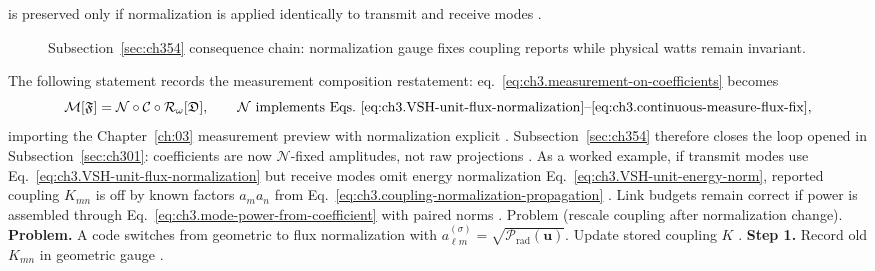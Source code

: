 is preserved only if normalization is applied identically to transmit and receive modes
\cite{harrington2001}.
\begin{figure}[t]
\centering
{}
\caption{Subsection~\ref{sec:ch354} consequence chain: normalization gauge fixes coupling reports while physical watts remain invariant.}
\label{fig:ch3.354-consequence-chain}
\end{figure}
The following statement records the measurement composition restatement: eq.~\eqref{eq:ch3.measurement-on-coefficients} becomes
\begin{equation}
\label{eq:ch3.measurement-normalized-coefficients}
\mathcal{M}[\mathfrak{F}]
=
\mathcal{N}\circ\mathcal{C}\circ\mathcal{R}_\omega[\mathfrak{D}],
\qquad
\mathcal{N}\ \text{implements Eqs.~\eqref{eq:ch3.VSH-unit-flux-normalization}--\eqref{eq:ch3.continuous-measure-flux-fix}},
\end{equation}
importing the Chapter~\ref{ch:03} measurement preview with normalization explicit \cite{harrington2001}.
Subsection~\ref{sec:ch354} therefore closes the loop opened in Subsection~\ref{sec:ch301}: coefficients are now
\(\mathcal{N}\)-fixed amplitudes, not raw projections \cite{hansen1988}.
As a worked example, if transmit modes use Eq.~\eqref{eq:ch3.VSH-unit-flux-normalization} but receive modes omit energy normalization
Eq.~\eqref{eq:ch3.VSH-unit-energy-norm}, reported coupling \(K_{mn}\) is off by known factors \(a_{m}a_{n}\) from
Eq.~\eqref{eq:ch3.coupling-normalization-propagation} \cite{harrington2001}. Link budgets remain correct if power is
assembled through Eq.~\eqref{eq:ch3.mode-power-from-coefficient} with paired norms \cite{stratton1941}.
Problem (rescale coupling after normalization change). \textbf{Problem.} A code switches from geometric to flux normalization with \(a_{\ell m}^{(\sigma)}=\sqrt{\mathcal{P}_{\mathrm{rad}}(\mathbf{u})}\).
Update stored coupling \(K\) \cite{harrington2001}.
\textbf{Step 1.} Record old \(K_{mn}\) in geometric gauge \cite{harrington2001}.
